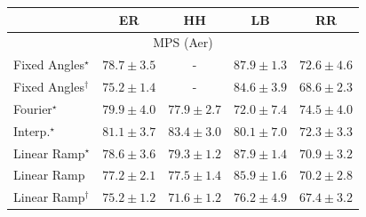 \begin{tabular}{l|cccc|}
\toprule
            & ER & HH & LB & RR \\
\midrule
\multicolumn{5}{c}{\rule{0pt}{8pt}MPS (Aer)} \\
\midrule
Fixed Angles$^\star$ & {\cellcolor[HTML]{883E9B}} \color[HTML]{F1F1F1} $78.7\pm 3.5$ & {\cellcolor[HTML]{000000}} \color[HTML]{F1F1F1} {\cellcolor{white}} \color{black} - & {\cellcolor[HTML]{6A0867}} \color[HTML]{F1F1F1} $87.9\pm 1.3$ & {\cellcolor[HTML]{8C66AF}} \color[HTML]{F1F1F1} $72.6\pm 4.6$ \\
Fixed Angles$^\dagger$ & {\cellcolor[HTML]{8A55A7}} \color[HTML]{F1F1F1} $75.2\pm 1.4$ & {\cellcolor[HTML]{000000}} \color[HTML]{F1F1F1} {\cellcolor{white}} \color{black} - & {\cellcolor[HTML]{81127E}} \color[HTML]{F1F1F1} $84.6\pm 3.9$ & {\cellcolor[HTML]{8C80BB}} \color[HTML]{F1F1F1} $68.6\pm 2.3$ \\
Fourier$^\star$ & {\cellcolor[HTML]{863595}} \color[HTML]{F1F1F1} $79.9\pm 4.0$ & {\cellcolor[HTML]{88449E}} \color[HTML]{F1F1F1} $77.9\pm 2.7$ & {\cellcolor[HTML]{8C6AB1}} \color[HTML]{F1F1F1} $72.0\pm 7.4$ & {\cellcolor[HTML]{8A5AA9}} \color[HTML]{F1F1F1} $74.5\pm 4.0$ \\
Interp.$^\star$ & {\cellcolor[HTML]{852D90}} \color[HTML]{F1F1F1} $81.1\pm 3.7$ & {\cellcolor[HTML]{831A83}} \color[HTML]{F1F1F1} $83.4\pm 3.0$ & {\cellcolor[HTML]{863394}} \color[HTML]{F1F1F1} $80.1\pm 7.0$ & {\cellcolor[HTML]{8C68AF}} \color[HTML]{F1F1F1} $72.3\pm 3.3$ \\
Linear Ramp$^\star$ & {\cellcolor[HTML]{88409C}} \color[HTML]{F1F1F1} $78.6\pm 3.6$ & {\cellcolor[HTML]{873A98}} \color[HTML]{F1F1F1} $79.3\pm 1.2$ & {\cellcolor[HTML]{6A0867}} \color[HTML]{F1F1F1} $87.9\pm 1.4$ & {\cellcolor[HTML]{8C71B4}} \color[HTML]{F1F1F1} $70.9\pm 3.2$ \\
Linear Ramp & {\cellcolor[HTML]{8949A1}} \color[HTML]{F1F1F1} $77.2\pm 2.1$ & {\cellcolor[HTML]{8947A0}} \color[HTML]{F1F1F1} $77.5\pm 1.4$ & {\cellcolor[HTML]{790D75}} \color[HTML]{F1F1F1} $85.9\pm 1.6$ & {\cellcolor[HTML]{8C76B7}} \color[HTML]{F1F1F1} $70.2\pm 2.8$ \\
Linear Ramp$^\dagger$ & {\cellcolor[HTML]{8A55A7}} \color[HTML]{F1F1F1} $75.2\pm 1.2$ & {\cellcolor[HTML]{8C6DB2}} \color[HTML]{F1F1F1} $71.6\pm 1.2$ & {\cellcolor[HTML]{894FA3}} \color[HTML]{F1F1F1} $76.2\pm 4.9$ & {\cellcolor[HTML]{8C88BF}} \color[HTML]{F1F1F1} $67.4\pm 3.2$ \\

\end{tabular}
